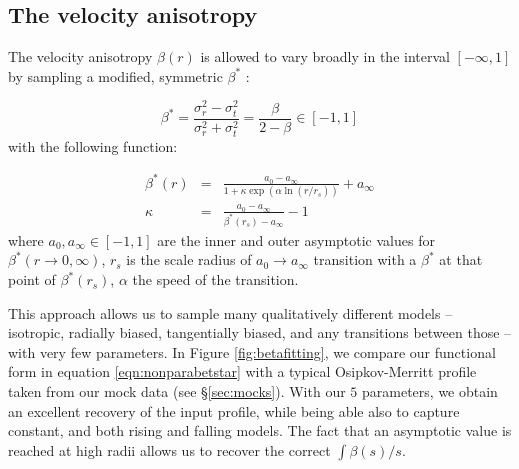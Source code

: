 \subsection{The velocity anisotropy}

The velocity anisotropy $\beta(r)$ is allowed to vary broadly in the interval
$[-\infty, 1]$ by sampling a modified, symmetric $\beta^*$
\citep[e.g.][]{2006MNRAS.367..387R}:

\begin{equation}\label{eqn:betastar}
    \beta^* = \frac{\sigma_r^2-\sigma_t^2}{\sigma_r^2+\sigma_t^2} = \frac{\beta}{2-\beta} \in [-1,1]
\end{equation}
with the following function:

\begin{eqnarray}
    \beta^*(r) &=& \frac{a_0-a_\infty}{1+\kappa \exp(\alpha\ln(r/r_s))}+a_\infty\\
    \kappa &=& \frac{a_0-a_\infty}{\beta^*(r_s)-a_\infty}-1
    \label{eqn:nonparabetstar}
\end{eqnarray}
where $a_0, a_\infty \in[-1, 1]$ are the inner and outer asymptotic values for
$\beta^*(r\to 0,\infty)$, $r_s$ is the scale radius of $a_0\to a_\infty$
transition with a $\beta^*$ at that point of $\beta^*(r_s)$, $\alpha$ the speed
of the transition.

This approach allows us to sample many qualitatively different models --
isotropic, radially biased, tangentially biased, and any transitions between
those -- with very few parameters. In Figure \ref{fig:betafitting}, we compare
our functional form in equation \ref{eqn:nonparabetstar} with a typical
Osipkov-Merritt profile taken from our mock data (see \S\ref{sec:mocks}). With
our $5$ parameters, we obtain an excellent recovery of the input profile, while
being able also to capture constant, and both rising and falling models. The
fact that an asymptotic value is reached at high radii allows us to recover the
correct $\int \beta(s)/s$.

